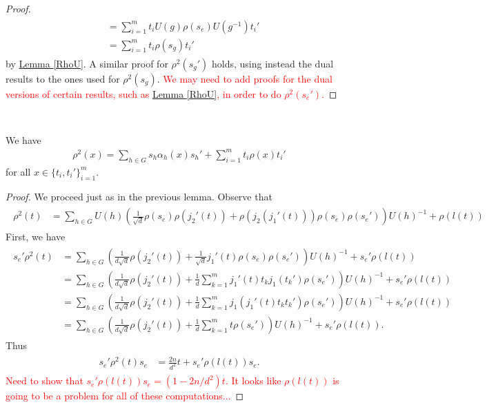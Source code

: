 \begin{proof}
\begin{align*}
\begin{split}
&= \sum_{i=1}^m t_iU(g)\rho(s_e)U(g^{-1})t_i'\\
&= \sum_{i=1}^m t_i\rho(s_g)t_i'
\end{split}
\end{align*}
\noindent by \hyperref[RhoU]{Lemma \ref*{RhoU}}. A similar proof for $\rho^2(s_g')$ holds, using instead the dual results to the ones used for $\rho^2(s_g)$. \textcolor{red}{We may need to add proofs for the dual versions of certain results, such as \hyperref[RhoU]{Lemma \ref*{RhoU}}, in order to do $\rho^2(s_e')$.}
\end{proof}\\

\noindent\begin{lemma} We have
\begin{align}
\rho^2(x) = \sum_{h \in G}s_h\alpha_h(x)s_h' + \sum_{i=1}^m t_i\rho(x)t_i'
\end{align}
\noindent for all $x \in \{t_i, t_i'\}_{i=1}^m$.\\
\end{lemma}

\noindent\begin{proof} We proceed just as in the previous lemma. Observe that
\begin{align*}
\begin{split}
\rho^2(t) &= \sum_{h \in G}U(h)\left(\frac{1}{\sqrt{d}}\rho(s_e)\rho(j_2'(t)) + \rho(j_2(j_1'(t)))\rho(s_e)\rho(s_e')\right)U(h)^{-1} + \rho(l(t))
\end{split}
\end{align*}
\noindent First, we have
\begin{align*}
\begin{split}
s_e'\rho^2(t) &= \sum_{h \in G}\left(\frac{1}{d\sqrt{d}}\rho(j_2'(t)) + \frac{1}{\sqrt{d}}j_1'(t)\rho(s_e)\rho(s_e')\right)U(h)^{-1} + s_e'\rho(l(t))\\
&= \sum_{h \in G}\left(\frac{1}{d\sqrt{d}}\rho(j_2'(t)) + \frac{1}{d}\sum_{k=1}^m j_1'(t)t_k j_1(t_k')\rho(s_e')\right)U(h)^{-1} + s_e'\rho(l(t))\\
&= \sum_{h \in G}\left(\frac{1}{d\sqrt{d}}\rho(j_2'(t)) + \frac{1}{d}\sum_{k=1}^m j_1(j_1'(t)t_kt_k')\rho(s_e')\right)U(h)^{-1} + s_e'\rho(l(t))\\
&= \sum_{h \in G}\left(\frac{1}{d\sqrt{d}}\rho(j_2'(t)) + \frac{1}{d}\sum_{k=1}^m t\rho(s_e')\right)U(h)^{-1} + s_e'\rho(l(t)).
\end{split}
\end{align*}
\noindent Thus
\begin{align*}
\begin{split}
s_e'\rho^2(t)s_e &= \frac{2n}{d^2}t + s_e'\rho(l(t))s_e.
\end{split}
\end{align*}
\noindent \textcolor{red}{Need to show that $s_e'\rho(l(t))s_e = (1 - 2n/d^2)t$. It looks like $\rho(l(t))$ is going to be a problem for all of these computations...}
\end{proof}\\

